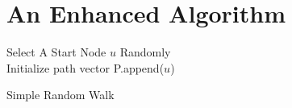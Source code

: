 \section{An Enhanced Algorithm}\label{sec:enhanced-algorithm-\myInitials}


\begin{algorithm}[H]
\SetAlgoLined
{}
Select A Start Node $u$ Randomly\\
Initialize path vector P.append($u$)\\
 \caption{Simple Random Walk}
 \label{alg:simple_rw}
\end{algorithm}